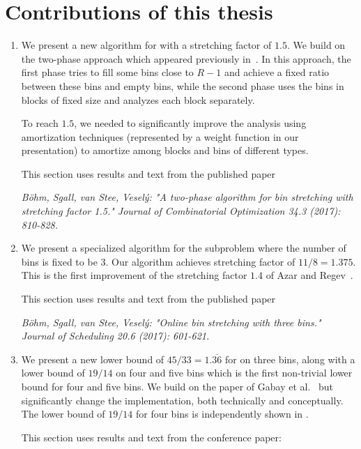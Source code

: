 \section{Contributions of this thesis}\label{sec:contrib}


\begin{enumerate}
\item We present a new algorithm for \binstretch
with a stretching factor of $1.5$.  We build on the two-phase approach
which appeared previously in~\cite{kellerer2013,gabay2013}. In this
approach, the first phase tries to fill some bins close to $R-1$ and
achieve a fixed ratio between these bins and empty bins, while the
second phase uses the bins in blocks of fixed size and analyzes each
block separately. 

To reach $1.5$, we needed to significantly improve the analysis using
amortization techniques (represented by a weight function in our
presentation) to amortize among blocks and bins of different types.

This section uses results and text from the published paper

\noindent\textit{Böhm, Sgall, van Stee, Veselý: "A two-phase algorithm
for bin stretching with stretching factor 1.5." Journal of
Combinatorial Optimization 34.3 (2017): 810-828.}

\item We present a specialized algorithm for the subproblem where the
number of bins is fixed to be 3. Our algorithm achieves stretching
factor of $11/8 = 1.375$.  This is the first improvement of the
stretching factor $1.4$ of Azar and Regev~\cite{azar98}.

This section uses results and text from the published paper

\noindent\textit{Böhm, Sgall, van Stee, Veselý: "Online bin
stretching with three bins." Journal of Scheduling 20.6 (2017):
601-621.}

\item We present a new lower bound of $45/33 = 1.\overline{36}$ for
\binstretch on three bins, along with a lower bound of $19/14$ on four
and five bins which is the first non-trivial lower bound for four and
five bins. We build on the paper of Gabay et al.~\cite{gabay2013lbv2}
but significantly change the implementation, both technically and
conceptually. The lower bound of $19/14$ for four bins is
independently shown in \cite{gabay2013lbv3}.

This section uses results and text from the conference paper:


\end{enumerate}
